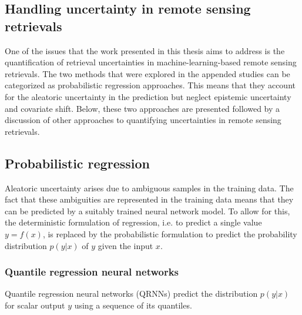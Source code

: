 \begin{description}
\section{Handling uncertainty in remote sensing retrievals}

One of the issues that the work presented in this thesis aims to address is the
quantification of retrieval uncertainties in machine-learning-based remote
sensing retrievals. The two methods that were explored in the appended studies
can be categorized as probabilistic regression approaches. This means that they
account for the aleatoric uncertainty in the prediction but neglect epistemic
uncertainty and covariate shift. Below, these two approaches are presented
followed by a discussion of other approaches to quantifying uncertainties in
remote sensing retrievals.

\subsection{Probabilistic regression}

Aleatoric uncertainty arises due to ambiguous samples in the training data. The
fact that these ambiguities are represented in the training data means that they
can be predicted by a suitably trained neural network model. To allow for this,
the deterministic formulation of regression, i.e. to predict a single value $y =
f(x)$, is replaced by the probabilistic formulation to predict the probability
distribution $p(y|x)$ of $y$ given the input $x$.

\subsubsection{Quantile regression neural networks}


Quantile regression neural networks (QRNNs) predict the distribution $p(y|x)$
for scalar output $y$ using a sequence of its quantiles.



\end{description}
